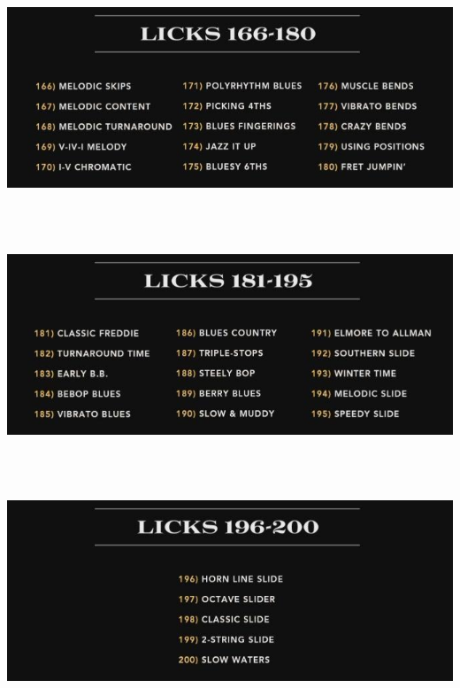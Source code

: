 \documentclass[a4paper]{book}
\begin{document}
\clearpage

\begin{center}
\includegraphics[width=17cm,height=6.881cm]{lebluessupportsmethodes-img28.jpg}
\end{center}


\begin{center}
\includegraphics[width=17cm,height=6.881cm]{lebluessupportsmethodes-img29.jpg}
\end{center}


\begin{center}
\includegraphics[width=17cm,height=6.881cm]{lebluessupportsmethodes-img30.jpg}
\end{center}
\end{document}
